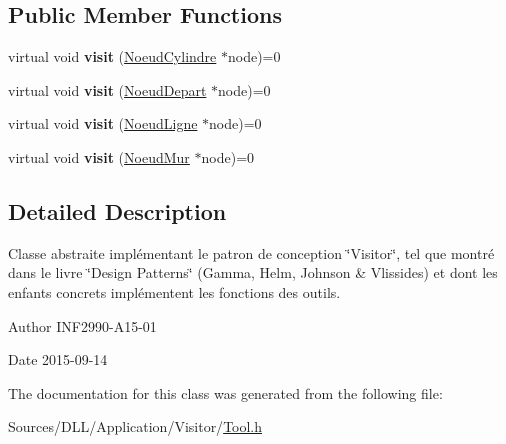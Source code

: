 \subsection*{Public Member Functions}
\begin{DoxyCompactItemize}
\item 
\hypertarget{class_tool_aae0deb2f98f4950c62a72d43f2b5e329}{}virtual void {\bfseries visit} (\hyperlink{class_noeud_cylindre}{Noeud\+Cylindre} $\ast$node)=0\label{class_tool_aae0deb2f98f4950c62a72d43f2b5e329}

\item 
\hypertarget{class_tool_ac2ff46411a7d46e2ee460dd392be2129}{}virtual void {\bfseries visit} (\hyperlink{class_noeud_depart}{Noeud\+Depart} $\ast$node)=0\label{class_tool_ac2ff46411a7d46e2ee460dd392be2129}

\item 
\hypertarget{class_tool_a62cce39f0f8d41eab92d06735f32933f}{}virtual void {\bfseries visit} (\hyperlink{class_noeud_ligne}{Noeud\+Ligne} $\ast$node)=0\label{class_tool_a62cce39f0f8d41eab92d06735f32933f}

\item 
\hypertarget{class_tool_afadb5dbece885b62cb43db48e8d89408}{}virtual void {\bfseries visit} (\hyperlink{class_noeud_mur}{Noeud\+Mur} $\ast$node)=0\label{class_tool_afadb5dbece885b62cb43db48e8d89408}

\end{DoxyCompactItemize}


\subsection{Detailed Description}
Classe abstraite implémentant le patron de conception \char`\"{}\+Visitor\char`\"{}, tel que montré dans le livre \char`\"{}\+Design Patterns\char`\"{} (Gamma, Helm, Johnson \& Vlissides) et dont les enfants concrets implémentent les fonctions des outils. 

\begin{DoxyAuthor}{Author}
I\+N\+F2990-\/\+A15-\/01 
\end{DoxyAuthor}
\begin{DoxyDate}{Date}
2015-\/09-\/14 
\end{DoxyDate}


The documentation for this class was generated from the following file\+:\begin{DoxyCompactItemize}
\item 
Sources/\+D\+L\+L/\+Application/\+Visitor/\hyperlink{_tool_8h}{Tool.\+h}\end{DoxyCompactItemize}
